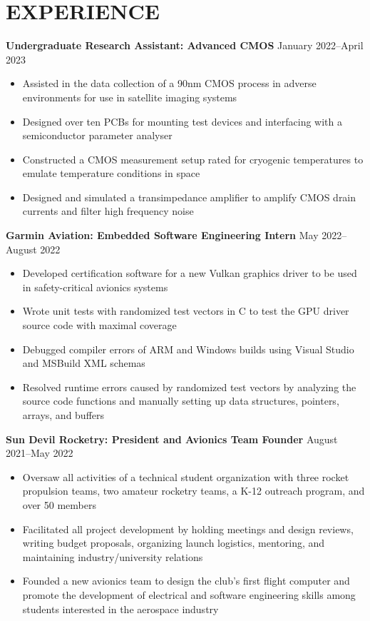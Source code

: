 \documentclass{article}
\begin{document}
\section{EXPERIENCE}
\textbf{Undergraduate Research Assistant: Advanced CMOS}
\hfill
\vspace{0.5em}
January 2022--April 2023
\begin{itemize}
\item{Assisted in the data collection of a 90nm CMOS process in adverse environments for use in satellite imaging systems}
\item{Designed over ten PCBs for mounting test devices and interfacing with a semiconductor parameter analyser}
\item{Constructed a CMOS measurement setup rated for cryogenic temperatures to emulate temperature conditions in space}
\item{Designed and simulated a transimpedance amplifier to amplify CMOS drain currents and filter high frequency noise}
\end{itemize}
\vspace{1em}
\textbf{Garmin Aviation: Embedded Software Engineering Intern}
\hfill
\vspace{0.5em}
May 2022--August 2022
\begin{itemize}
\item{Developed certification software for a new Vulkan graphics driver to be used in safety-critical avionics systems}
\item{Wrote unit tests with randomized test vectors in C to test the GPU driver source code with maximal coverage}
\item{Debugged compiler errors of ARM and Windows builds using Visual Studio and MSBuild XML schemas}
\item{Resolved runtime errors caused by randomized test vectors by analyzing the source code functions and manually setting up data structures, pointers, arrays, and buffers}
\end{itemize}
\vspace{1em}
\textbf{Sun Devil Rocketry: President and Avionics Team Founder}
\hfill
\vspace{0.5em}
August 2021--May 2022
\begin{itemize}
\item{Oversaw all activities of a technical student organization with three rocket propulsion teams, two amateur rocketry teams, a K-12 outreach program, and over 50 members   }
\item{Facilitated all project development by holding meetings and design reviews, writing budget proposals, organizing launch logistics, mentoring, and maintaining industry/university relations}
\item{Founded a new avionics team to design the club's first flight computer and promote the development of electrical and software engineering skills among students interested in the aerospace industry}
\vspace{1em}
\end{itemize}
\end{document}
